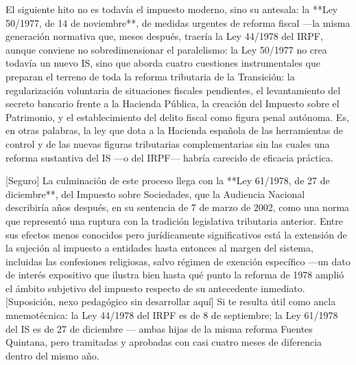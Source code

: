 \documentclass[10pt,a4paper]{article}
\begin{document}
El siguiente hito no es todavía el impuesto moderno, sino su antesala: la **Ley 50/1977, de 14 de noviembre**, de medidas urgentes de reforma fiscal —la misma generación normativa que, meses después, traería la Ley 44/1978 del IRPF, aunque conviene no sobredimensionar el paralelismo: la Ley 50/1977 no crea todavía un nuevo IS, sino que aborda cuatro cuestiones instrumentales que preparan el terreno de toda la reforma tributaria de la Transición: la regularización voluntaria de situaciones fiscales pendientes, el levantamiento del secreto bancario frente a la Hacienda Pública, la creación del Impuesto sobre el Patrimonio, y el establecimiento del delito fiscal como figura penal autónoma. Es, en otras palabras, la ley que dota a la Hacienda española de las herramientas de control y de las nuevas figuras tributarias complementarias sin las cuales una reforma sustantiva del IS —o del IRPF— habría carecido de eficacia práctica.

[Seguro] La culminación de este proceso llega con la **Ley 61/1978, de 27 de diciembre**, del Impuesto sobre Sociedades, que la Audiencia Nacional describiría años después, en su sentencia de 7 de marzo de 2002, como una norma que representó una ruptura con la tradición legislativa tributaria anterior. Entre sus efectos menos conocidos pero jurídicamente significativos está la extensión de la sujeción al impuesto a entidades hasta entonces al margen del sistema, incluidas las confesiones religiosas, salvo régimen de exención específico —un dato de interés expositivo que ilustra bien hasta qué punto la reforma de 1978 amplió el ámbito subjetivo del impuesto respecto de su antecedente inmediato. [Suposición, nexo pedagógico sin desarrollar aquí] Si te resulta útil como ancla mnemotécnica: la Ley 44/1978 del IRPF es de 8 de septiembre; la Ley 61/1978 del IS es de 27 de diciembre — ambas hijas de la misma reforma Fuentes Quintana, pero tramitadas y aprobadas con casi cuatro meses de diferencia dentro del mismo año.
\end{document}
